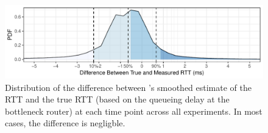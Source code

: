 \begin{figure}
    \centering
\begin{knitrout}
\color{fgcolor}
\includegraphics[width=\maxwidth]{figure/micro:delay-1} 

\end{knitrout}
    \caption{Distribution of the difference between \name's smoothed estimate of the RTT and 
    the true RTT (based on the queueing delay at the bottleneck router) at each time point across all experiments. In most cases, the difference
    is negligble.}
    \label{fig:micro:delay}
\end{figure}
